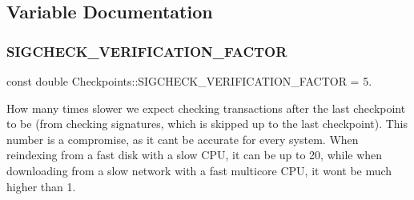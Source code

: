 \subsection{Variable Documentation}
\mbox{\label{namespace_checkpoints_a1ba658141a1d43d78b956b6952e0320c}} 
\subsubsection{\texorpdfstring{S\+I\+G\+C\+H\+E\+C\+K\+\_\+\+V\+E\+R\+I\+F\+I\+C\+A\+T\+I\+O\+N\+\_\+\+F\+A\+C\+T\+OR}{SIGCHECK\_VERIFICATION\_FACTOR}}
{\footnotesize\ttfamily const double Checkpoints\+::\+S\+I\+G\+C\+H\+E\+C\+K\+\_\+\+V\+E\+R\+I\+F\+I\+C\+A\+T\+I\+O\+N\+\_\+\+F\+A\+C\+T\+OR = 5.\hspace{0.3cm}{\ttfamily [static]}}

How many times slower we expect checking transactions after the last checkpoint to be (from checking signatures, which is skipped up to the last checkpoint). This number is a compromise, as it can\textquotesingle{}t be accurate for every system. When reindexing from a fast disk with a slow C\+PU, it can be up to 20, while when downloading from a slow network with a fast multicore C\+PU, it won\textquotesingle{}t be much higher than 1. 